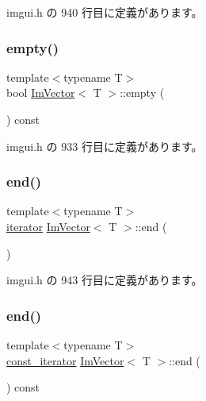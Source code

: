  imgui.\+h の 940 行目に定義があります。

\mbox{\label{class_im_vector_aa53e48a5272f4bad1099368769514ff1}} 
\subsubsection{\texorpdfstring{empty()}{empty()}}
{\footnotesize\ttfamily template$<$typename T$>$ \\
bool \mbox{\hyperlink{class_im_vector}{Im\+Vector}}$<$ T $>$\+::empty (\begin{DoxyParamCaption}{ }\end{DoxyParamCaption}) const\hspace{0.3cm}{\ttfamily [inline]}}



 imgui.\+h の 933 行目に定義があります。

\mbox{\label{class_im_vector_a947fbc3b1d8c1997e51ae6caab440379}} 
\subsubsection{\texorpdfstring{end()}{end()}\hspace{0.1cm}{\footnotesize\ttfamily [1/2]}}
{\footnotesize\ttfamily template$<$typename T$>$ \\
\mbox{\hyperlink{class_im_vector_a74b5478f1f6fd471cc71219bce483db6}{iterator}} \mbox{\hyperlink{class_im_vector}{Im\+Vector}}$<$ T $>$\+::end (\begin{DoxyParamCaption}{ }\end{DoxyParamCaption})\hspace{0.3cm}{\ttfamily [inline]}}



 imgui.\+h の 943 行目に定義があります。

\mbox{\label{class_im_vector_a06efa87357864d1c130f0f400eeccf8d}} 
\subsubsection{\texorpdfstring{end()}{end()}\hspace{0.1cm}{\footnotesize\ttfamily [2/2]}}
{\footnotesize\ttfamily template$<$typename T$>$ \\
\mbox{\hyperlink{class_im_vector_aedeac9c5080f9d6ce96ae837768ee4c4}{const\+\_\+iterator}} \mbox{\hyperlink{class_im_vector}{Im\+Vector}}$<$ T $>$\+::end (\begin{DoxyParamCaption}{ }\end{DoxyParamCaption}) const\hspace{0.3cm}{\ttfamily [inline]}}



